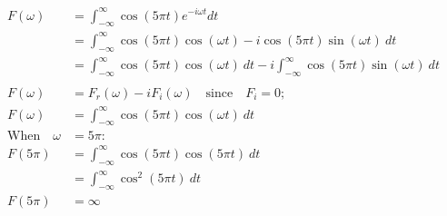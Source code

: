 \documentclass[preview]{standalone}
\begin{document}
\begin{align*}
F(\omega)&= \int_{-\infty}^{\infty} \cos{(5\pi t)}e^{-i\omega t} dt \\ &= \int_{-\infty}^{\infty} \cos{(5\pi t)}\cos{(\omega t)}-i\cos{(5\pi t)}\sin{(\omega t)} \ dt \\ &=\int_{-\infty}^{\infty} \cos{(5\pi t)}\cos{(\omega t)} \ dt - i\int_{-\infty}^{\infty} \cos{(5\pi t)}\sin{(\omega t)} \ dt \\ \\ F(\omega)&=F_{r}(\omega)-iF_{i}(\omega) \quad \textrm{since} \quad F_{i}=0; \\  F(\omega)&=\int_{-\infty}^{\infty} \cos{(5\pi t)}\cos{(\omega t)} \ dt \\  \textrm{When} \quad \omega&=5\pi : \\ F(5\pi)&=\int_{-\infty}^{\infty} \cos{(5\pi t)}\cos{(5\pi t)} \ dt \\  &=\int_{-\infty}^{\infty} \cos^{2}{(5\pi t)} \ dt \\  F(5\pi)&=\infty
\end{align*}
\end{document}
